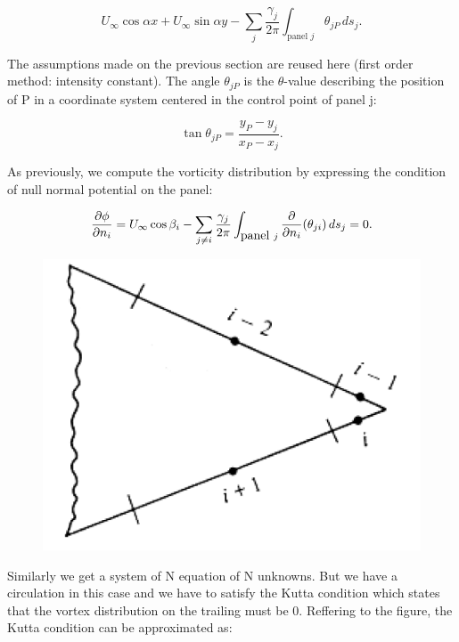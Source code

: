 	\begin{equation}
	U_\infty \cos \alpha x +U_\infty \sin \alpha y - \sum _j \frac{\gamma _j}{2\pi} \int _{\mbox{panel }j} \theta _{jP} \, ds_j.
	\end{equation}
	
	The assumptions made on the previous section are reused here (first order method: intensity constant). The angle $\theta _{jP}$ is the $\theta$-value describing the position of P in a coordinate system centered in the control point of panel j:
	
	\begin{equation}
	\tan \theta _{jP} = \frac{y_P-y_j}{x_P - x_j}.
	\end{equation}
	
	As previously, we compute the vorticity distribution by expressing the condition of null normal potential on the panel:
	
	\begin{equation}
	\frac{\partial \phi}{\partial n_i} = U_\infty \cos \beta _i - \sum _{j\neq i} \frac{\gamma_j}{2\pi} \int _{\mbox{panel }j} \frac{\partial}{\partial n_i} (\theta _{ji}) \, ds_j = 0.
	\end{equation}
	
	\begin{figure}
	\vspace{-5mm}
	\includegraphics[scale=0.15]{ch2/43}
	\end{figure}
	Similarly we get a system of N equation of N unknowns. But we have a circulation in this case and we have to satisfy the Kutta condition which states that the vortex distribution on the trailing must be 0. Reffering to the figure, the Kutta condition can be approximated as:
	

